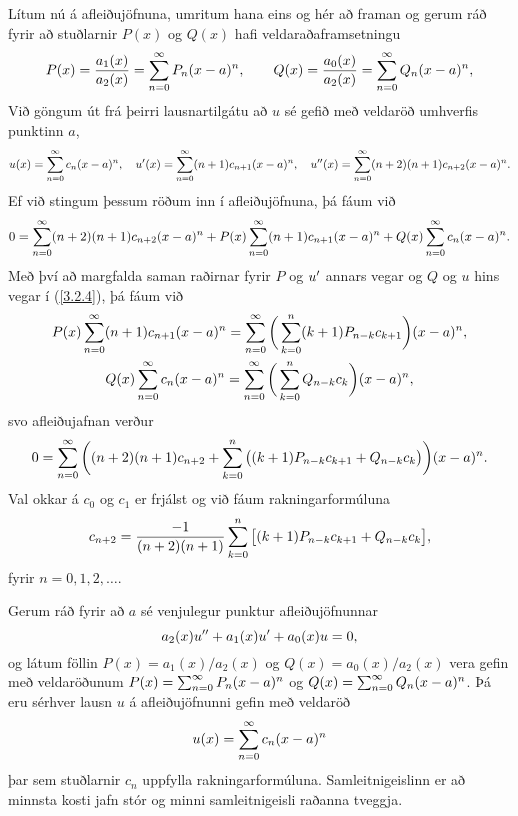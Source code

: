 Lítum nú á afleiðujöfnuna, umritum hana eins og hér að framan
og gerum ráð fyrir að stuðlarnir $P(x)$ og $Q(x)$ hafi
veldaraðaframsetningu 
 \begin{equation*}
P(x)=\dfrac{a_1(x)}{a_2(x)}= \sum_{n=0}\sp \infty P_n(x-a)\sp n,
\qquad
Q(x)=\dfrac{a_0(x)}{a_2(x)}= \sum_{n=0}\sp \infty Q_n(x-a)\sp n,\label{3.2.4}
 \end{equation*}
Við göngum út frá þeirri lausnartilgátu að $u$ sé gefið með veldaröð 
umhverfis punktinn $a$,
$$
u(x)=\sum\limits_{n=0}\sp\infty c_n(x-a)\sp n, \quad
u'(x)=\sum\limits_{n=0}\sp\infty (n+1)c_{n+1}(x-a)\sp n, \quad
u{\sp{\prime\prime}}(x)=\sum\limits_{n=0}\sp\infty (n+2)(n+1)c_{n+2}(x-a)\sp n.
 $$
Ef við stingum þessum röðum  inn í afleiðujöfnuna, þá fáum við 
 $$
0= \sum_{n=0}\sp \infty (n+2)(n+1)c_{n+2}(x-a)\sp n +
P(x)\sum_{n=0}\sp \infty (n+1)c_{n+1}(x-a)\sp n +
Q(x)\sum_{n=0}\sp \infty c_n(x-a)\sp n.
 $$
Með því að margfalda saman raðirnar fyrir $P$ og $u{\sp{\prime}}$ annars vegar 
og $Q$ og $u$ hins vegar í (\ref{3.2.4}), þá fáum við 
\begin{gather*}
P(x)\sum_{n=0}\sp \infty (n+1)c_{n+1}(x-a)\sp n=
\sum_{n=0}\sp\infty  
\bigg(\sum_{k=0}\sp n (k+1)P_{n-k}c_{k+1}\bigg)(x-a)\sp n,\\
Q(x)\sum_{n=0}\sp \infty c_n(x-a)\sp n=
 \sum_{n=0}\sp\infty  
\bigg( \sum_{k=0}\sp n  Q_{n-k}c_k\bigg) (x-a)\sp n,
\end{gather*}
svo afleiðujafnan verður
$$
0= \sum_{n=0}\sp \infty 
\bigg((n+2)(n+1)c_{n+2} +
\sum_{k=0}\sp{n} \big((k+1)P_{n-k}c_{k+1}+
Q_{n-k} c_k\big)\bigg)(x-a)\sp n.
$$
Val okkar á $c_0$ og $c_1$ er frjálst og við fáum rakningarformúluna
 \begin{equation*} c_{n+2} = \dfrac{-1}{(n+2)(n+1)}
\sum_{k=0}\sp n \big[(k+1)P_{n-k}c_{k+1} +  Q_{n-k}c_k\big],\label{3.2.5}
 \end{equation*}
fyrir $n=0,1,2,\dots$. 

\begin{se}
Gerum ráð fyrir að $a$ sé venjulegur  punktur afleiðujöfnunnar 
 \begin{equation*}a_2(x)u{\sp{\prime\prime}}+a_1(x)u{\sp{\prime}}+a_0(x)u=0,
\label{3.2.6}
 \end{equation*}
og látum föllin $P(x)=a_1(x)/a_2(x)$ og $Q(x)=a_0(x)/a_2(x)$ 
vera gefin með velda\-röð\-unum 
$P(x)=\sum_{n=0}\sp \infty P_n(x-a)\sp n$
og $Q(x)= \sum_{n=0}\sp \infty Q_n(x-a)\sp n$.
Þá eru sérhver lausn $u$ á afleiðujöfnunni  gefin með veldaröð
 $$u(x)=\sum_{n=0}\sp \infty c_n(x-a)\sp n
 $$
þar sem stuðlarnir $c_n$  uppfylla rakningarformúluna.
Samleitnigeislinn er að minnsta kosti jafn stór og minni
samleitnigeisli raðanna tveggja.
\end{se}

